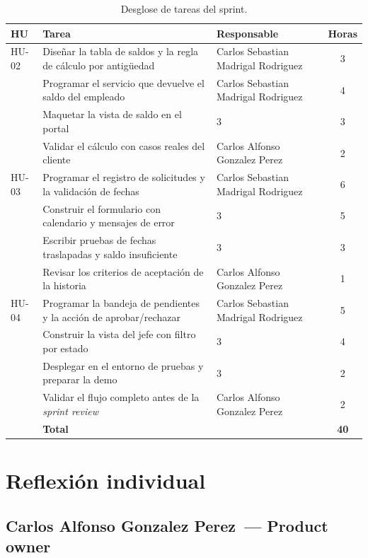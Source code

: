 \documentclass[12pt,letterpaper]{article}
\newcommand{\IntA}{Carlos Alfonso Gonzalez Perez}
\newcommand{\IntB}{Carlos Sebastian Madrigal Rodriguez}
\newcommand{\IntC}{3}
\begin{document}
\begin{table}[H]
\centering
\caption{Desglose de tareas del sprint.}
\small
\begin{tabularx}{\textwidth}{lLlc}
\toprule
\textbf{HU} & \textbf{Tarea} & \textbf{Responsable} & \textbf{Horas} \\
\midrule
HU-02 & Diseñar la tabla de saldos y la regla de cálculo por antigüedad & \IntB & 3 \\
      & Programar el servicio que devuelve el saldo del empleado          & \IntB & 4 \\
      & Maquetar la vista de saldo en el portal                            & \IntC & 3 \\
      & Validar el cálculo con casos reales del cliente                    & \IntA & 2 \\
\midrule
HU-03 & Programar el registro de solicitudes y la validación de fechas    & \IntB & 6 \\
      & Construir el formulario con calendario y mensajes de error         & \IntC & 5 \\
      & Escribir pruebas de fechas traslapadas y saldo insuficiente        & \IntC & 3 \\
      & Revisar los criterios de aceptación de la historia                 & \IntA & 1 \\
\midrule
HU-04 & Programar la bandeja de pendientes y la acción de aprobar/rechazar & \IntB & 5 \\
      & Construir la vista del jefe con filtro por estado                  & \IntC & 4 \\
      & Desplegar en el entorno de pruebas y preparar la demo              & \IntC & 2 \\
      & Validar el flujo completo antes de la \emph{sprint review}         & \IntA & 2 \\
\midrule
      & \textbf{Total}                                                     &       & \textbf{40} \\
\bottomrule
\end{tabularx}
\end{table}

\section{Reflexión individual}


\subsection*{\IntA\ — Product owner}
\end{document}
